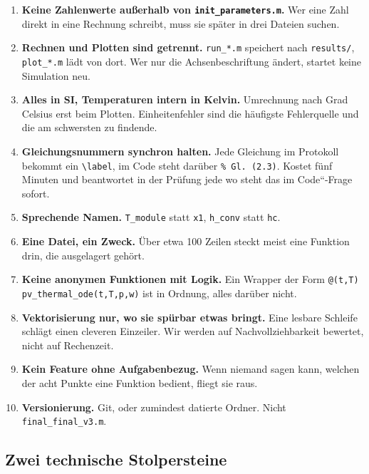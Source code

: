 \documentclass[11pt,a4paper]{scrartcl}
\providecommand{\glqq}{\quotedblbase}
\providecommand{\grqq}{\textquotedblleft}
\begin{document}
\begin{enumerate}[label=\textbf{R\arabic*.}, leftmargin=*]
  \item \textbf{Keine Zahlenwerte au{\ss}erhalb von \texttt{init\_parameters.m}.}
        Wer eine Zahl direkt in eine Rechnung schreibt, muss sie sp\"ater in
        drei Dateien suchen.
  \item \textbf{Rechnen und Plotten sind getrennt.} \texttt{run\_*.m}
        speichert nach \texttt{results/}, \texttt{plot\_*.m} l\"adt von dort.
        Wer nur die Achsenbeschriftung \"andert, startet keine Simulation neu.
  \item \textbf{Alles in SI, Temperaturen intern in Kelvin.} Umrechnung nach
        Grad Celsius erst beim Plotten. Einheitenfehler sind die h\"aufigste
        Fehlerquelle und die am schwersten zu findende.
  \item \textbf{Gleichungsnummern synchron halten.} Jede Gleichung im
        Protokoll bekommt ein \texttt{\textbackslash label}, im Code steht
        dar\"uber \texttt{\% Gl. (2.3)}. Kostet f\"unf Minuten und beantwortet
        in der Pr\"ufung jede \glqq wo steht das im Code\grqq-Frage sofort.
  \item \textbf{Sprechende Namen.} \texttt{T\_module} statt \texttt{x1},
        \texttt{h\_conv} statt \texttt{hc}.
  \item \textbf{Eine Datei, ein Zweck.} \"Uber etwa 100 Zeilen steckt meist
        eine Funktion drin, die ausgelagert geh\"ort.
  \item \textbf{Keine anonymen Funktionen mit Logik.} Ein Wrapper der Form
        \texttt{@(t,T) pv\_thermal\_ode(t,T,p,w)} ist in Ordnung, alles
        dar\"uber nicht.
  \item \textbf{Vektorisierung nur, wo sie sp\"urbar etwas bringt.} Eine
        lesbare Schleife schl\"agt einen cleveren Einzeiler. Wir werden auf
        Nachvollziehbarkeit bewertet, nicht auf Rechenzeit.
  \item \textbf{Kein Feature ohne Aufgabenbezug.} Wenn niemand sagen kann,
        welchen der acht Punkte eine Funktion bedient, fliegt sie raus.
  \item \textbf{Versionierung.} Git, oder zumindest datierte Ordner. Nicht
        \texttt{final\_final\_v3.m}.
\end{enumerate}

\subsection{Zwei technische Stolpersteine}
\end{document}
